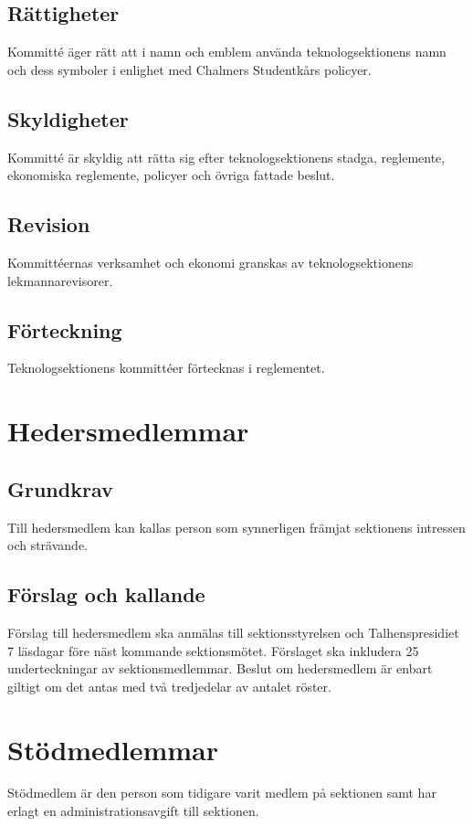 \documentclass[a4paper]{dtek}
\begin{document}
\subsection{Rättigheter}
Kommitté äger rätt att i namn och emblem använda teknologsektionens namn och dess symboler i enlighet med Chalmers Studentkårs policyer.
\subsection{Skyldigheter}
Kommitté är skyldig att rätta sig efter teknologsektionens stadga, reglemente, ekonomiska reglemente, policyer och övriga fattade beslut.
\subsection{Revision}
Kommittéernas verksamhet och ekonomi granskas av teknologsektionens lekmannarevisorer.
\subsection{Förteckning}
Teknologsektionens kommittéer förtecknas i reglementet.
\newpage

\section{Hedersmedlemmar}
\subsection{Grundkrav}
Till hedersmedlem kan kallas person som synnerligen främjat sektionens intressen och strävande.
\subsection{Förslag och kallande}
Förslag till hedersmedlem ska anmälas till sektionsstyrelsen och Talhenspresidiet 7 läsdagar före näst kommande sektionsmötet.
Förslaget ska inkludera 25 underteckningar av sektionsmedlemmar.
Beslut om hedersmedlem är enbart giltigt om det antas med två tredjedelar av antalet röster.
\newpage

\section{Stödmedlemmar}
Stödmedlem är den person som tidigare varit medlem på sektionen samt har erlagt en administrationsavgift till sektionen.
\newpage
\end{document}
